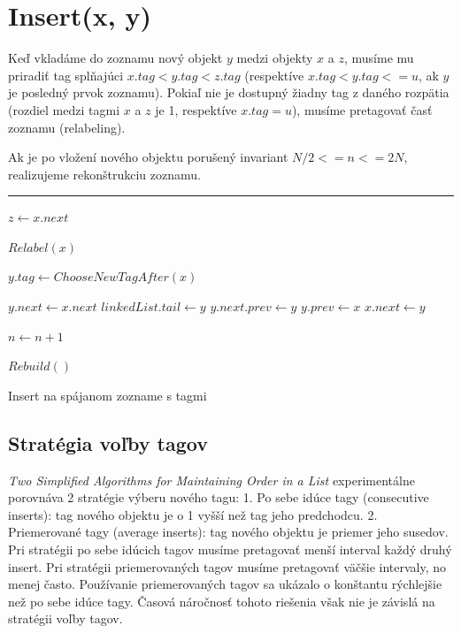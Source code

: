 \documentclass[
  digital,     %
  oneside,     %
  nosansbold,  %
  nocolorbold, %
  lof,         %
  lot,         %
]{fithesis4}
\begin{document}
\section{Insert(x, y)}

Keď vkladáme do zoznamu nový objekt $y$ medzi objekty $x$ a $z$, musíme mu priradiť tag splňajúci $x.tag < y.tag < z.tag$ (respektíve $x.tag < y.tag <= u$, ak $y$ je posledný prvok zoznamu).
Pokiaľ nie je dostupný žiadny tag z daného rozpätia (rozdiel medzi tagmi $x$ a $z$ je 1, respektíve $x.tag = u$), musíme pretagovať časť zoznamu (relabeling).

Ak je po vložení nového objektu porušený invariant $N/2 <= n <= 2N$, realizujeme rekonštrukciu zoznamu.

\begin{algorithm}
\hrule\vspace{0.2em}
$z \leftarrow x.next$\;

{
    $Relabel(x)$\;
}

$y.tag \leftarrow ChooseNewTagAfter(x)$\;

$y.next \leftarrow x.next$\;
{
    $linkedList.tail \leftarrow y$\;
}
\Else
{
    $y.next.prev \leftarrow y$\;
}
$y.prev \leftarrow x$\;
$x.next \leftarrow y$\;


$n \leftarrow n + 1$\;

{
    $Rebuild()$\;
}
\caption{Insert na spájanom zozname s tagmi}
\end{algorithm}

\subsection*{Stratégia voľby tagov}

\textit{Two Simplified Algorithms for Maintaining Order in a List} \cite{paper1_ordered_list} experimentálne porovnáva 2 stratégie výberu nového tagu:
1. Po sebe idúce tagy (consecutive inserts): tag nového objektu je o 1 vyšší než tag jeho predchodcu.
2. Priemerované tagy (average inserts): tag nového objektu je priemer jeho susedov.
Pri stratégii po sebe idúcich tagov musíme pretagovať menší interval každý druhý insert. Pri stratégii priemerovaných tagov musíme pretagovať väčšie intervaly, no menej často.
Používanie priemerovaných tagov sa ukázalo o konštantu rýchlejšie než po sebe idúce tagy. Časová náročnosť tohoto riešenia však nie je závislá na stratégii voľby tagov.
\end{document}
